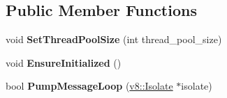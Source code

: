 \subsection*{Public Member Functions}
\begin{DoxyCompactItemize}
\item 
void {\bfseries Set\+Thread\+Pool\+Size} (int thread\+\_\+pool\+\_\+size)\hypertarget{classv8_1_1platform_1_1_default_platform_a7dcc9c2ff945dfa873df908419b52599}{}\label{classv8_1_1platform_1_1_default_platform_a7dcc9c2ff945dfa873df908419b52599}

\item 
void {\bfseries Ensure\+Initialized} ()\hypertarget{classv8_1_1platform_1_1_default_platform_a54d4db61eee06562636227cc5c697953}{}\label{classv8_1_1platform_1_1_default_platform_a54d4db61eee06562636227cc5c697953}

\item 
bool {\bfseries Pump\+Message\+Loop} (\hyperlink{classv8_1_1_isolate}{v8\+::\+Isolate} $\ast$isolate)\hypertarget{classv8_1_1platform_1_1_default_platform_a8ef516da228f326547ae9539690c76e6}{}\label{classv8_1_1platform_1_1_default_platform_a8ef516da228f326547ae9539690c76e6}


\end{DoxyCompactItemize}
